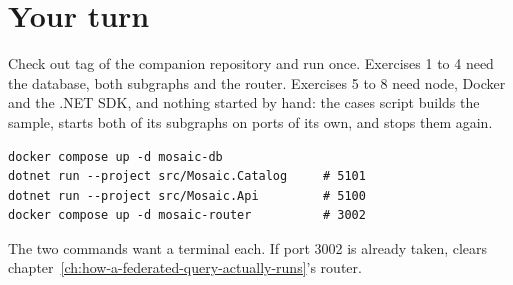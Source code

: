 \section*{Your turn}

Check out tag  of the companion repository and run 
once. Exercises 1 to 4 need the database, both subgraphs and the router.
Exercises 5 to 8 need node, Docker and the .NET SDK, and nothing started by
hand: the cases script builds the sample, starts both of its subgraphs on ports
of its own, and stops them again.

\begin{verbatim}
docker compose up -d mosaic-db
dotnet run --project src/Mosaic.Catalog     # 5101
dotnet run --project src/Mosaic.Api         # 5100
docker compose up -d mosaic-router          # 3002
\end{verbatim}

The two  commands want a terminal each. If port 3002 is
already taken,  clears
chapter~\ref{ch:how-a-federated-query-actually-runs}'s router.

